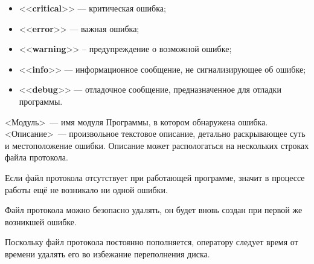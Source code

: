 \documentclass[12pt, a4paper, twocolumn]{report}
\newcommand{\CTL}[1]{<<{\bf #1}>>}
\begin{document}
\begin{itemize}
\item \CTL{critical} --- критическая ошибка;
\item \CTL{error} --- важная ошибка;
\item \CTL{warning} -- предупреждение о возможной ошибке;
\item \CTL{info} --- информационное сообщение, не сигнализирующее об ошибке;
\item \CTL{debug} --- отладочное сообщение, предназначенное для отладки программы.
\end{itemize}

<Модуль>~--- имя модуля Программы, в котором обнаружена ошибка. <Описание>~--- произвольное текстовое описание, детально раскрывающее суть и местоположение ошибки. Описание может распологаться на нескольких строках файла протокола.

Если файл протокола отсутствует при работающей программе, значит в процессе работы ещё не возникало ни одной ошибки.

Файл протокола можно безопасно удалять, он будет вновь создан при первой же возникшей ошибке.

Поскольку файл протокола постоянно пополняется, оператору следует время от времени удалять его во избежание переполнения диска.
\end{document}
